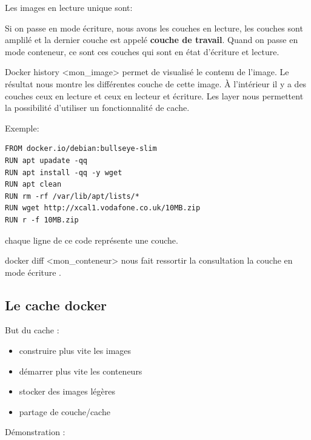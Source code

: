 \documentclass[12pt,a4paper]{article}
\begin{document}
Les images en lecture unique sont:

Si on passe en mode écriture, nous avons les couches en lecture, les couches sont amplilé et la dernier couche est appelé \textbf{couche de travail}. Quand on passe en mode conteneur, ce sont ces couches qui sont en état d'écriture et lecture.

Docker history <mon\_image> permet de visualisé le contenu de l'image. Le résultat nous montre les différentes couche de cette image. À l'intérieur il y a des couches ceux en lecture et ceux en lecteur et écriture. 
Les layer nous permettent la possibilité d'utiliser un fonctionnalité de cache.

Exemple: 

\begin{verbatim}
FROM docker.io/debian:bullseye-slim
RUN apt upadate -qq
RUN apt install -qq -y wget
RUN apt clean
RUN rm -rf /var/lib/apt/lists/*
RUN wget http://xcal1.vodafone.co.uk/10MB.zip
RUN r -f 10MB.zip
\end{verbatim}

chaque ligne de ce code représente une couche.


docker diff <mon\_conteneur> nous fait ressortir la consultation la couche en mode écriture .



\subsection{Le cache docker}
But du cache : 
\begin{itemize}
\item construire plus vite les images
\item démarrer plus vite les conteneurs
\item stocker des images légères
\item partage de couche/cache
\end{itemize}
Démonstration : \\
\end{document}

